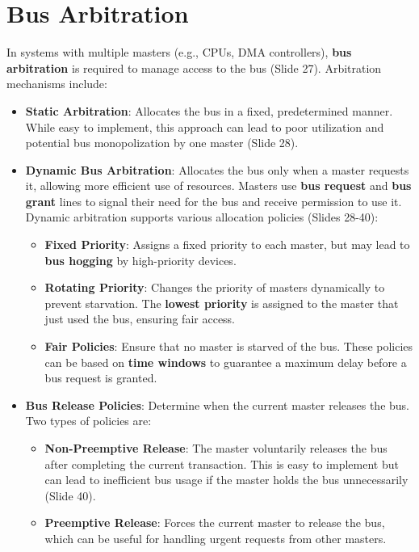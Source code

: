 \documentclass[
  14pt,
  a4paper,
  numbers=noendperiod,
  headinclude=true,
  footinclude=true,
  DIV=calc]{scrreprt}
\begin{document}
\section{Bus Arbitration}\label{bus-arbitration}

In systems with multiple masters (e.g., CPUs, DMA controllers),
\textbf{bus arbitration} is required to manage access to the bus (Slide
27). Arbitration mechanisms include:

\begin{itemize}
\item
  \textbf{Static Arbitration}: Allocates the bus in a fixed,
  predetermined manner. While easy to implement, this approach can lead
  to poor utilization and potential bus monopolization by one master
  (Slide 28).
\item
  \textbf{Dynamic Bus Arbitration}: Allocates the bus only when a master
  requests it, allowing more efficient use of resources. Masters use
  \textbf{bus request} and \textbf{bus grant} lines to signal their need
  for the bus and receive permission to use it. Dynamic arbitration
  supports various allocation policies (Slides 28-40):

  \begin{itemize}
  \item
    \textbf{Fixed Priority}: Assigns a fixed priority to each master,
    but may lead to \textbf{bus hogging} by high-priority devices.
  \item
    \textbf{Rotating Priority}: Changes the priority of masters
    dynamically to prevent starvation. The \textbf{lowest priority} is
    assigned to the master that just used the bus, ensuring fair access.
  \item
    \textbf{Fair Policies}: Ensure that no master is starved of the bus.
    These policies can be based on \textbf{time windows} to guarantee a
    maximum delay before a bus request is granted.
  \end{itemize}
\item
  \textbf{Bus Release Policies}: Determine when the current master
  releases the bus. Two types of policies are:

  \begin{itemize}
  \item
    \textbf{Non-Preemptive Release}: The master voluntarily releases the
    bus after completing the current transaction. This is easy to
    implement but can lead to inefficient bus usage if the master holds
    the bus unnecessarily (Slide 40).
  \item
    \textbf{Preemptive Release}: Forces the current master to release
    the bus, which can be useful for handling urgent requests from other
    masters.
  \end{itemize}
\end{itemize}
\end{document}
